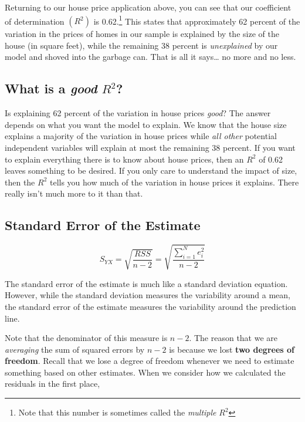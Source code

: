 \documentclass[
]{book}
\begin{document}
Returning to our house price application above, you can see that our coefficient of determination \((R^2)\) is 0.62.\footnote{Note that this number is sometimes called the \emph{multiple} \(R^2\)} This states that approximately 62 percent of the variation in the prices of homes in our sample is explained by the size of the house (in square feet), while the remaining 38 percent is \emph{unexplained} by our model and shoved into the garbage can. That is all it says\ldots{} no more and no less.

\hypertarget{what-is-a-good-r2}{%
\subsection{\texorpdfstring{What is a \emph{good} \(R^2\)?}{What is a good R\^{}2?}}\label{what-is-a-good-r2}}

Is explaining 62 percent of the variation in house prices \emph{good}? The answer depends on what you want the model to explain. We know that the house size explains a majority of the variation in house prices while \emph{all other} potential independent variables will explain at most the remaining 38 percent. If you want to explain everything there is to know about house prices, then an \(R^2\) of 0.62 leaves something to be desired. If you only care to understand the impact of size, then the \(R^2\) tells you how much of the variation in house prices it explains. There really isn't much more to it than that.

\hypertarget{standard-error-of-the-estimate}{%
\subsection{Standard Error of the Estimate}\label{standard-error-of-the-estimate}}

\[S_{YX} = \sqrt{\frac{RSS}{n-2}} = \sqrt{\frac{\sum^{N}_{i=1}e_i^2}{n-2}}\]

The standard error of the estimate is much like a standard deviation equation. However, while the standard deviation measures the variability around a mean, the standard error of the estimate measures the variability around the prediction line.

Note that the denominator of this measure is \(n-2\). The reason that we are \emph{averaging} the sum of squared errors by \(n-2\) is because we lost \textbf{two degrees of freedom}. Recall that we lose a degree of freedom whenever we need to estimate something based on other estimates. When we consider how we calculated the residuals in the first place,
\end{document}
